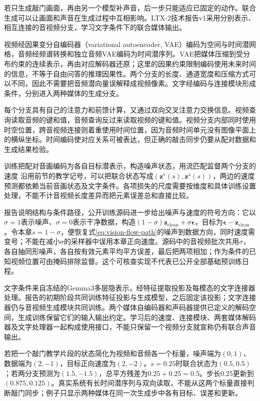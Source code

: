 若只生成敲门画面，再由另一个模型补声音，后一步只能适应已固定的动作。联合生成可以让画面和声音在生成过程中互相影响。LTX-2技术报告v1采用分别表示、相互连接的音视频分支，学习文字条件下的联合媒体输出。

视频经因果变分自编码器（variational autoencoder, VAE）编码为空间与时间潜网格，音频经频谱转换和独立音频VAE编码为时间潜序列。VAE把媒体压缩到受分布约束的连续表示，再由对应解码器还原；这里的因果约束限制编码使用未来时间的信息，不等于自由问答的推理因果性。两个分支的长度、通道宽度和压缩方式可以不同，因此不需要把音频潜向量误解释成视频像素。文字经编码与连接模块形成条件，分别进入两种媒体的生成分支。

每个分支具有自己的注意力和前馈计算，又通过双向交叉注意力交换信息。视频查询读取音频的键和值，音频查询反过来读取视频的键和值。视频分支内部同时使用时空位置，跨音视频连接则着重使用时间位置，因为音频时间单元没有图像平面上的横纵坐标。时间编码使对应关系可被表达，但正确的敲击同步仍要从配对数据和生成结果检验。

训练把配对音画编码为各自目标潜表示，构造噪声状态，用流匹配监督两个分支的速度
沿用前节的教学记号，可以把联合状态写成$(\bm z^{\mathrm v}(s),\bm z^{\mathrm a}(s))$，两边的速度预测都依赖当前音画状态及文字条件。各项损失的尺度需要按维度和具体训练设置处理，不能不计音视频长度差异而把元素误差总和直接比较。

报告说明结构与条件路径，公开训练源码进一步给出噪声与速度的符号方向：它以$\sigma=1$表示噪声、$\sigma=0$表示干净数据，构造$(1-\sigma)\bm z_{\mathrm{clean}}+\sigma\bm\epsilon$，目标为$\bm\epsilon-\bm z_{\mathrm{clean}}$。令本章$s=1-\sigma$，便恢复式\eqref{eq:vision-flow-path}的噪声到数据方向，同时速度需变号；不能在减小$\sigma$的采样器中误用本章正向速度。源码中的音视频批次共用$\sigma$，各自抽同形噪声，各自按有效元素平均平方误差，最后把两项相加；作为条件的已知视频位置可由掩码排除监督。这个可核查实现不代表已公开全部基础预训练日程。

文字条件来自冻结的Gemma3多层隐表示，经特征提取投影及每模态的文字连接器处理。报告的初期阶段共同训练特征投影与生成模型，之后固定该投影；文字连接器仍与音视频生成模块共同训练。两个媒体自编码器和声码器提供已定义的解码空间，生成训练保留它们的输入输出约定。学习后的速度、连接模块、两套媒体解码器及文字处理器一起构成使用接口，不能只保留一个视频分支就宣称仍有联合声音输出。

若把一个敲门教学片段的状态简化为视频和音频各一个标量，噪声端为$(0,1)$、数据端为$(2,-1)$，目标正向速度为$(2,-2)$。$s=0.25$时联合状态为$(0.5,0.5)$；若两分支预测为$(1.5,-1.5)$，总平方残差为$0.25+0.25=0.5$。步长0.25更新到$(0.875,0.125)$。真实系统有长时间潜序列与双向读取，不能从这两个标量直接判断敲门同步；例子只显示两种媒体在同一次生成步中各有目标、误差和更新。

